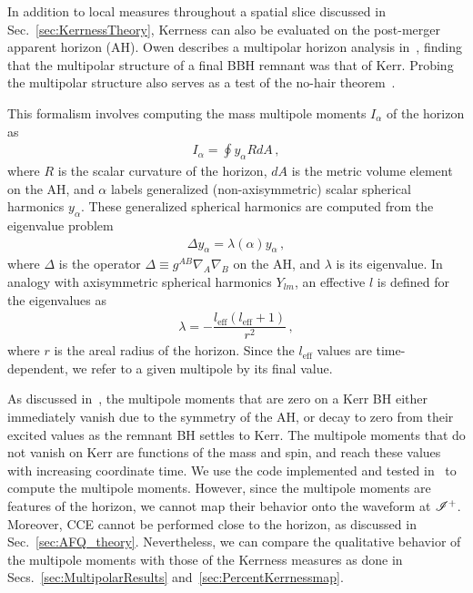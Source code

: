 In addition to local measures throughout a spatial slice discussed in Sec.~\ref{sec:KerrnessTheory}, Kerrness can also be evaluated on the post-merger apparent horizon (AH). Owen describes a multipolar horizon analysis in~\cite{Owen:2009sb}, finding that the multipolar structure of a final BBH remnant was that of Kerr. Probing the multipolar structure also serves as a test of the no-hair theorem~\cite{Teukolsky:2014vca}. 

This formalism involves computing the mass multipole moments $I_\alpha$ of the horizon as 
\begin{align}
I_\alpha = \oint y_\alpha R dA\,,
\end{align}
where $R$ is the scalar curvature of the horizon, $dA$ is the metric volume element on the AH, and $\alpha$ labels generalized (non-axisymmetric) scalar spherical harmonics $y_\alpha$. These generalized spherical harmonics are computed from the eigenvalue problem 
\begin{align}
\Delta y_\alpha = \lambda(\alpha) y_\alpha\,,
\end{align}
where $\Delta$ is the operator $\Delta \equiv g^{AB} \nabla_A \nabla_B$ on the AH, and $\lambda$ is its eigenvalue. In analogy with axisymmetric spherical harmonics $Y_{lm}$, an effective $l$ is defined for the eigenvalues as 
\begin{align}
\label{eq:leff}
\lambda = -\dfrac{l_\mathrm{eff}(l_\mathrm{eff} + 1)}{r^2}\,,
\end{align}
where $r$ is the areal radius of the horizon. Since the $l_\mathrm{eff}$ values are time-dependent, we refer to a given multipole by its final value. 

As discussed in~\cite{Owen:2009sb}, the multipole moments that are zero on a Kerr BH either immediately vanish due to the symmetry of the AH, or decay to zero from their excited values as the remnant BH settles to Kerr. The multipole moments that do not vanish on Kerr are functions of the mass and spin, and reach these values with increasing coordinate time. We use the code implemented and tested in~\cite{Owen:2009sb} to compute the multipole moments. However, since the multipole moments are features of the horizon, we cannot map their behavior onto the waveform at $\mathscr{I^+}$. Moreover, CCE cannot be performed close to the horizon, as discussed in Sec.~\ref{sec:AFQ_theory}. Nevertheless, we can compare the qualitative behavior of the multipole moments with those of the Kerrness measures as done in Secs.~\ref{sec:MultipolarResults} and~\ref{sec:PercentKerrnessmap}.


